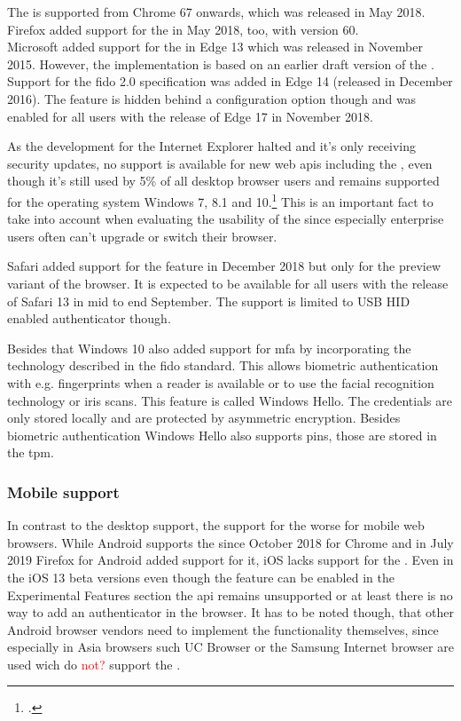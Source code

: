 The \wa{} is supported from Chrome 67 onwards, which was released in May 2018. Firefox added support for the \wa{} in May 2018, too, with version 60.\\
Microsoft added support for the \wa{} in Edge 13 which was released in November 2015. However, the implementation is based on an earlier draft version of the \wa. Support for the \gls{fido} 2.0 specification was added in Edge 14 (released in December 2016). The feature is hidden behind a configuration option though and was enabled for all users with the release of Edge 17 in November 2018.

As the development for the Internet Explorer halted and it's only receiving security updates, no support is available for new web \glspl{api} including the \wa, even though it's still used by 5\% of all desktop browser users and remains supported for the operating system Windows 7, 8.1 and 10.\footcite[See][]{ie-support}
 This is an important fact to take into account when evaluating the usability of the \wa{} since especially enterprise users often can't upgrade or switch their browser.

Safari added support for the \wa{} feature in December 2018 but only for the preview variant of the browser. It is expected to be available for all users with the release of Safari 13 in mid to end September. The support is limited to USB HID enabled authenticator though.

Besides that Windows 10 also added support for \gls{mfa} by incorporating the technology described in the \gls{fido} standard. This allows biometric authentication with e.g. fingerprints when a reader is available or to use the facial recognition technology or iris scans. This feature is called \frqq Windows Hello\flqq{}. The credentials are only stored locally and are protected by asymmetric encryption. Besides biometric authentication Windows Hello also supports \glspl{pin}, those are stored in the \gls{tpm}.

\subsubsection{Mobile support}

In contrast to the desktop support, the support for the \wa{} worse for mobile web browsers. While Android supports the \wa{} since October 2018 for Chrome and in July 2019 Firefox for Android added support for it, iOS lacks support for the \wa. Even in the iOS 13 beta versions even though the feature can be enabled in the \frqq Experimental Features\flqq{} section the \gls{api} remains unsupported or at least there is no way to add an authenticator in the browser. It has to be noted though, that other Android browser vendors need to implement the functionality themselves, since especially in Asia browsers such \frqq UC Browser\flqq{} or the \frqq Samsung Internet\flqq{} browser are used wich do \textcolor{red}{not?} support the \wa.

